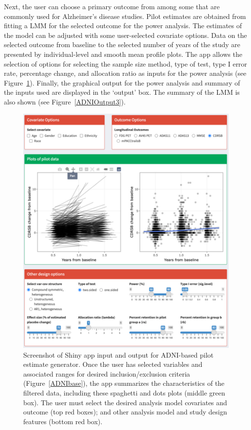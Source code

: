 Next, the user can choose a primary outcome from among some that are  commonly used for Alzheimer's disease studies. Pilot estimates are obtained from fitting a LMM for the selected outcome for the power analysis. The estimates of the model can be adjusted with some user-selected covariate options. Data on the selected outcome from baseline to the selected number of years of the study are presented by individual-level and smooth mean profile plots. The app allows the selection of options for selecting the sample size method, type of test, type I error rate, percentage change, and allocation ratio as inputs for the power analysis (see Figure~\ref{ADNIOutput2}). Finally, the graphical output for the power analysis and summary of the inputs used are displayed in the `output' box. The summary of the LMM is also shown (see Figure~\ref{ADNIOutput3}). 

\begin{figure}[htp!]
	\includegraphics[width=14cm]{Figures/ADNI-mmrm-out2.pdf}
	\caption{Screenshot of Shiny app input and output for ADNI-based pilot estimate generator. Once the user has selected variables and associated ranges for desired inclusion/exclusion criteria (Figure~\ref{ADNIbase}), the app summarizes the characteristics of the filtered data, including these spaghetti and dots plots (middle green box). The user must select the desired analysis model covariates and outcome (top red boxes); and other analysis model and study design features (bottom red box).}\label{ADNIOutput2}
\end{figure}

